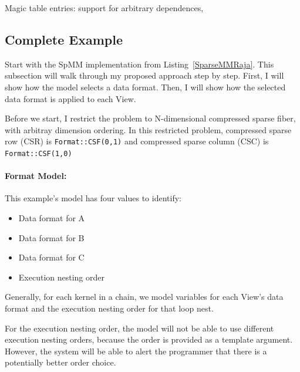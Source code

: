 \documentclass{article}
\begin{document}
Magic table entries: support for arbitrary dependences, 

\subsection{Complete Example}

Start with the SpMM implementation from Listing~\ref{SparseMMRaja}.
This subsection will walk through my proposed approach step by step.
First, I will show how the model selects a data format. 
Then, I will show how the selected data format is applied to each View.

Before we start, I restrict the problem to N-dimensional compressed sparse fiber, with arbitray dimension ordering. 
In this restricted problem, compressed sparse row (CSR) is \verb.Format::CSF(0,1). and compressed sparse column (CSC) is  \verb.Format::CSF(1,0).

\paragraph{Format Model:}
This example's model has four values to identify:
\begin{itemize}
    \item Data format for A
    \item Data format for B
    \item Data format for C
    \item Execution nesting order
\end{itemize}
Generally, for each kernel in a chain, we model variables for each View's data format and the execution nesting order for that loop nest.


For the execution nesting order, the model will not be able to use different execution nesting orders, because the order is provided as a template argument. 
However, the system will be able to alert the programmer that there is a potentially better order choice.
\end{document}
